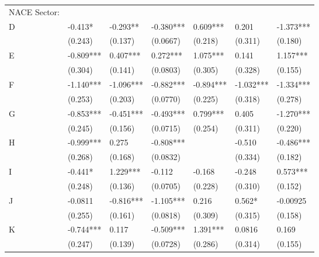 \documentclass[12pt]{article}
\begin{document}
\begin{table}[thb]
{\begin{threeparttable}
\begin{tabular}{l*{6}{l}}
NACE Sector:              \\[1ex]
\quad D                   &  -0.413*   & -0.293**  & -0.380***  & 0.609***  & 0.201      & -1.373***  \\
                          &  (0.243)   & (0.137)   & (0.0667)   & (0.218)   & (0.311)    & (0.180)    \\[0.5ex]

\quad E                   &  -0.809*** & 0.407***  & 0.272***   & 1.075***  & 0.141      & 1.157***   \\
                          &  (0.304)   & (0.141)   & (0.0803)   & (0.305)   & (0.328)    & (0.155)    \\[0.5ex]

\quad F                   &  -1.140*** & -1.096*** & -0.882***  & -0.894*** & -1.032***  & -1.334***  \\
                          &  (0.253)   & (0.203)   & (0.0770)   & (0.225)   & (0.318)    & (0.278)    \\[0.5ex]

\quad G                   &  -0.853*** & -0.451*** & -0.493***  & 0.799***  & 0.405      & -1.270***  \\
                          &  (0.245)   & (0.156)   & (0.0715)   & (0.254)   & (0.311)    & (0.220)    \\[0.5ex]

\quad H                   &  -0.999*** & 0.275     & -0.808***  &           & -0.510     & -0.486***  \\
                          &  (0.268)   & (0.168)   & (0.0832)   &           & (0.334)    & (0.182)    \\[0.5ex]

\quad I                   &  -0.441*   & 1.229***  & -0.112     & -0.168    & -0.248     & 0.573***   \\
                          &  (0.248)   & (0.136)   & (0.0705)   & (0.228)   & (0.310)    & (0.152)    \\[0.5ex]

\quad J                   &  -0.0811   & -0.816*** & -1.105***  & 0.216     & 0.562*     & -0.00925   \\
                          &  (0.255)   & (0.161)   & (0.0818)   & (0.309)   & (0.315)    & (0.158)    \\[0.5ex]

\quad K                   &  -0.744*** & 0.117     & -0.509***  & 1.391***  & 0.0816     & 0.169      \\
                          &  (0.247)   & (0.139)   & (0.0728)   & (0.286)   & (0.314)    & (0.155)    \\[0.5ex]


\end{tabular}
\end{threeparttable}}
\end{table}
\end{document}
